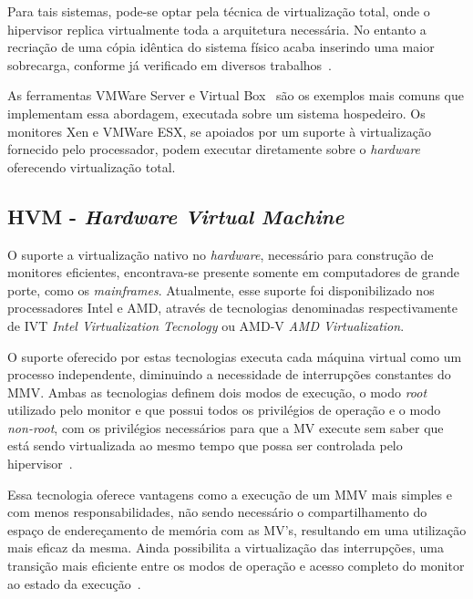 \documentclass[times, 10pt,twocolumn]{article}
\def\hw{\textit{hardware}\xspace}
\def\hpv{hipervisor\xspace}
\begin{document}
Para tais sistemas, pode-se optar pela técnica de virtualização total, onde o \hpv
replica virtualmente toda a arquitetura necessária. No entanto a recriação de uma 
cópia idêntica do sistema físico acaba inserindo uma maior sobrecarga, conforme
já  verificado em diversos trabalhos~\cite{barham}. 

As ferramentas VMWare Server e Virtual Box~\cite{vbox} são os exemplos mais comuns  
que implementam essa abordagem, executada sobre um sistema hospedeiro. Os monitores
Xen e VMWare ESX, se apoiados por um suporte à virtualização fornecido pelo processador, 
podem executar diretamente sobre o \hw oferecendo virtualização total.

\subsection{HVM - \textit{Hardware Virtual Machine}}\label{s:hvm}
O suporte a virtualização nativo no \hw, necessário para construção de monitores
eficientes, encontrava-se presente somente em computadores de grande porte, como os
\textit{mainframes}. Atualmente, esse suporte foi disponibilizado nos processadores
Intel e AMD, através de tecnologias denominadas respectivamente de IVT \textit{Intel 
Virtualization Tecnology} ou AMD-V \textit{AMD Virtualization}.

O suporte oferecido por estas tecnologias executa cada máquina virtual como um 
processo independente, diminuindo a necessidade de interrupções constantes do MMV.
Ambas as tecnologias definem dois modos de execução, o modo \textit{root} utilizado 
pelo monitor e que possui todos os privilégios de operação e o modo \textit{non-root},
com os privilégios necessários para que a MV execute sem saber que está sendo 
virtualizada ao mesmo tempo que possa ser controlada pelo \hpv~\cite{intel}. 

Essa tecnologia oferece vantagens como a execução de um MMV mais simples e com menos 
responsabilidades, não sendo necessário o compartilhamento do espaço de endereçamento
de memória com as MV's, resultando em uma utilização mais eficaz da mesma. Ainda 
possibilita a virtualização das interrupções, uma transição mais eficiente entre 
os modos de operação e acesso completo do monitor ao estado da execução~\cite{tg-gilberto}. 

 
\end{document}
